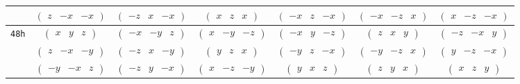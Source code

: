 \documentclass[fleqn,9pt,landscape]{jsarticle}
\begin{document}
\begin{center}
\begin{longtable}{ccccccc}
& $ \begin{pmatrix} z & - x & - x \end{pmatrix} $ & $ \begin{pmatrix} - z & x & - x \end{pmatrix} $ & $ \begin{pmatrix} x & z & x \end{pmatrix} $ & $ \begin{pmatrix} - x & z & - x \end{pmatrix} $ & $ \begin{pmatrix} - x & - z & x \end{pmatrix} $ & $ \begin{pmatrix} x & - z & - x \end{pmatrix} $ \\ \hline
{\tt 48h} & $ \begin{pmatrix} x & y & z \end{pmatrix} $ & $ \begin{pmatrix} - x & - y & z \end{pmatrix} $ & $ \begin{pmatrix} x & - y & - z \end{pmatrix} $ & $ \begin{pmatrix} - x & y & - z \end{pmatrix} $ & $ \begin{pmatrix} z & x & y \end{pmatrix} $ & $ \begin{pmatrix} - z & - x & y \end{pmatrix} $ \\
& $ \begin{pmatrix} z & - x & - y \end{pmatrix} $ & $ \begin{pmatrix} - z & x & - y \end{pmatrix} $ & $ \begin{pmatrix} y & z & x \end{pmatrix} $ & $ \begin{pmatrix} - y & z & - x \end{pmatrix} $ & $ \begin{pmatrix} - y & - z & x \end{pmatrix} $ & $ \begin{pmatrix} y & - z & - x \end{pmatrix} $ \\
& $ \begin{pmatrix} - y & - x & z \end{pmatrix} $ & $ \begin{pmatrix} - z & y & - x \end{pmatrix} $ & $ \begin{pmatrix} x & - z & - y \end{pmatrix} $ & $ \begin{pmatrix} y & x & z \end{pmatrix} $ & $ \begin{pmatrix} z & y & x \end{pmatrix} $ & $ \begin{pmatrix} x & z & y \end{pmatrix} $ \\

\end{longtable}
\end{center}
\end{document}
